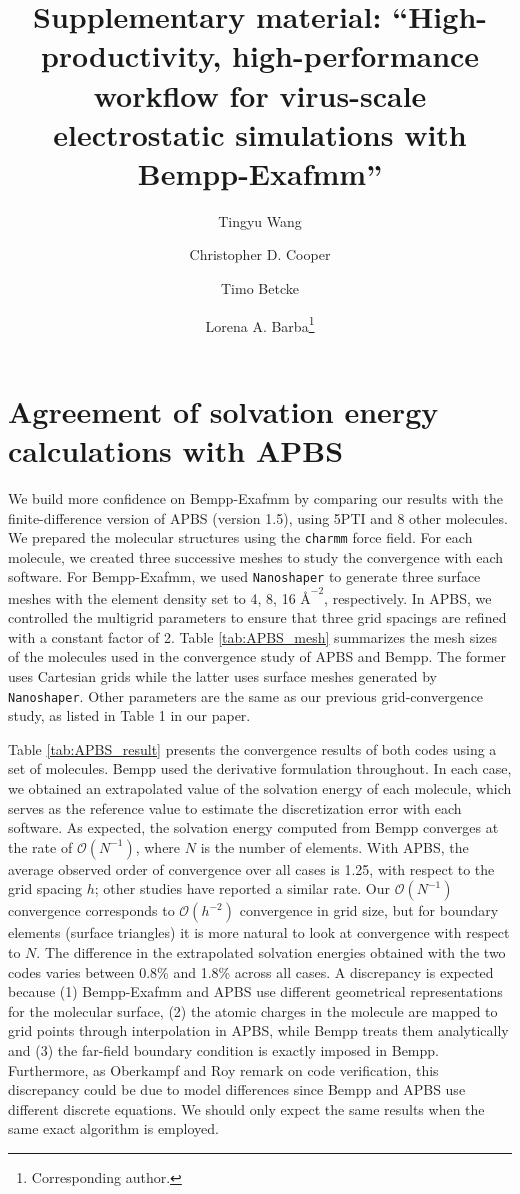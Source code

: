 \documentclass[11pt]{article}
\title{Supplementary material: ``High-productivity, high-performance workflow for virus-scale electrostatic simulations with Bempp-Exafmm''}
\author[1]{\small Tingyu Wang}
\author[2]{\small Christopher D. Cooper}
\author[3]{\small Timo Betcke}
\author[1]{\small Lorena A. Barba\thanks{Corresponding author.}}
\affil[1]{\footnotesize Department of Mechanical and Aerospace Engineering, The George Washington University, Washington, DC, USA}
\affil[2]{\footnotesize Department of Mechanical Engineering and Centro Cient\'ifico Tecnol\'ogico de Valpara\'iso, Universidad T\'ecnica Federico Santa Mar\'ia, Valpara\'iso, Chile}
\affil[3]{\footnotesize Department of Mathematics, University College London, UK}
\begin{document}
\maketitle

\section*{Agreement of solvation energy calculations with APBS}
We build more confidence on Bempp-Exafmm by comparing our results with the finite-difference version of APBS (version 1.5), using 5PTI and 8 other molecules.
We prepared the molecular structures using the \texttt{charmm} force field.
For each molecule, we created three successive meshes to study the convergence with each software.
For Bempp-Exafmm, we used \texttt{Nanoshaper} to generate three surface meshes with the element density set to 4, 8, 16 ${\si{\angstrom}}^{-2}$, respectively.
In APBS, we controlled the multigrid parameters to ensure that three grid spacings are refined with a constant factor of 2.
Table \ref{tab:APBS_mesh} summarizes the mesh sizes of the molecules used in the convergence study of APBS and Bempp.
The former uses Cartesian grids while the latter uses surface meshes generated by \texttt{Nanoshaper}.
Other parameters are the same as our previous grid-convergence study, as listed in Table 1 in our paper.

Table \ref{tab:APBS_result} presents the convergence results of both codes using a set of molecules.
Bempp used the derivative formulation throughout.
In each case, we obtained an extrapolated value of the solvation energy of each molecule, which serves as the reference value to estimate the discretization error with each software.
As expected, the solvation energy computed from Bempp converges at the rate of $\mathcal{O}(N^{-1})$, where $N$ is the number of elements.
With APBS, the average observed order of convergence over all cases is 1.25, with respect to the grid spacing $h$; other studies \cite{CooperBardhanBarba2014,GengKrasny2013} have reported a similar rate. 
Our $\mathcal{O}(N^{-1})$ convergence corresponds to $\mathcal{O}(h^{-2})$ convergence in grid size, but for boundary elements (surface triangles) it is more natural to look at convergence with respect to $N$.
The difference in the extrapolated solvation energies obtained with the two codes varies between 0.8\% and 1.8\% across all cases.
A discrepancy is expected because (1) Bempp-Exafmm and APBS use different geometrical representations for the molecular surface, (2) the atomic charges in the molecule are mapped to grid points through interpolation in APBS, while Bempp treats them analytically and (3) the far-field boundary condition is exactly imposed in Bempp.
Furthermore, as Oberkampf and Roy \cite{oberkampf_roy_2010} remark on code verification, this discrepancy could be due to model differences since Bempp and APBS use different discrete equations.
We should only expect the same results when the same exact algorithm is employed.
\end{document}
